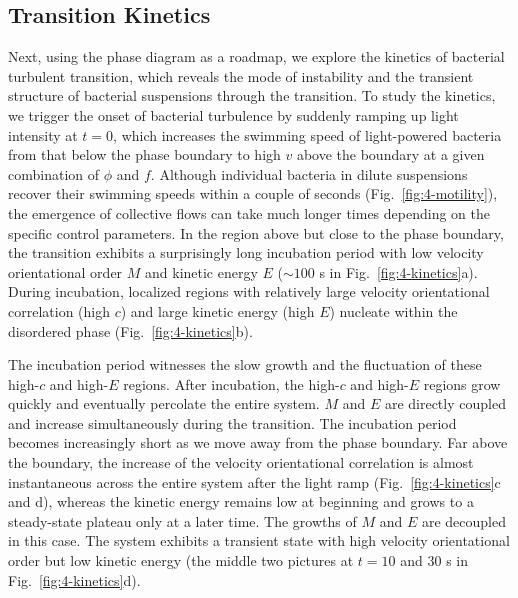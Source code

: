\subsection{Transition Kinetics}
Next, using the phase diagram as a roadmap, we explore the kinetics of bacterial turbulent transition, which reveals the mode of instability and the transient structure of bacterial suspensions through the transition. To study the kinetics, we trigger the onset of bacterial turbulence by suddenly ramping up light intensity at $t = 0$, which increases the swimming speed of light-powered bacteria from that below the phase boundary to high $v$ above the boundary at a given combination of $\phi$ and $f$. Although individual bacteria in dilute suspensions recover their swimming speeds within a couple of seconds (Fig.~\ref{fig:4-motility}), the emergence of collective flows can take much longer times depending on the specific control parameters. In the region above but close to the phase boundary, the transition exhibits a surprisingly long incubation period with low velocity orientational order $M$ and kinetic energy $E$ ($\sim 100$ s in Fig.~\ref{fig:4-kinetics}a). During incubation, localized regions with relatively large velocity orientational correlation (high $c$) and large kinetic energy (high $E$) nucleate within the disordered phase (Fig.~\ref{fig:4-kinetics}b).

The incubation period witnesses the slow growth and the fluctuation of these high-$c$ and high-$E$ regions. After incubation, the high-$c$ and high-$E$ regions grow quickly and eventually percolate the entire system.
$M$ and $E$ are directly coupled and increase simultaneously during the transition. The incubation period becomes increasingly short as we move away from the phase boundary.
Far above the boundary, the increase of the velocity orientational correlation is almost instantaneous across the entire system after the light ramp (Fig.~\ref{fig:4-kinetics}c and d), whereas the kinetic energy remains low at beginning and grows to a steady-state plateau only at a later time.
The growths of $M$ and $E$ are decoupled in this case.
The system exhibits a transient state with high velocity orientational order but low kinetic energy (the middle two pictures at $t = 10$ and $30$ s in Fig.~\ref{fig:4-kinetics}d).

